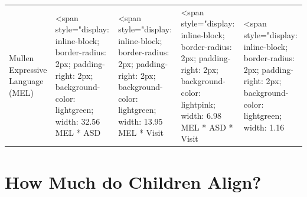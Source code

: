 \documentclass[article,30pt,extrafontsizes]{memoir}
\begin{document}
\begin{adjmulticols*}{3}{}{}
\begin{table}
\begin{tabular}[t]{l|l|l}
\hline
Mullen Expressive Language (MEL) & <span style="display: inline-block; border-radius: 2px; padding-right: 2px; background-color: lightgreen; width: 32.56%
\hline
MEL * ASD & <span style="display: inline-block; border-radius: 2px; padding-right: 2px; background-color: lightgreen; width: 13.95%
\hline
MEL * Visit & <span style="display: inline-block; border-radius: 2px; padding-right: 2px; background-color: lightpink; width: 6.98%
\hline
MEL * ASD * Visit & <span style="display: inline-block; border-radius: 2px; padding-right: 2px; background-color: lightgreen; width: 1.16%
\hline
\end{tabular}
\end{table}

\section{How Much do Children Align?}\label{how-much-do-children-align}

\begin{table}


\end{table}
\end{adjmulticols*}
\end{document}
